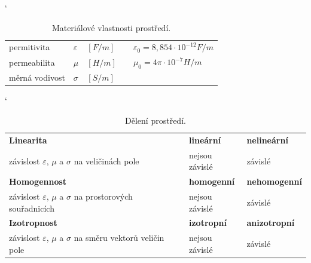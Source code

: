 \begin{table}[!h]
\catcode` 
\begin{center}
  	\caption{Materiálové vlastnosti prostředí.}
  	\label{tab:evlny_parametry_prostredi}
\begin{tabular}{|lllp{1.5cm}l|}
	\hline
	permitivita		& $\varepsilon$	& $\unit{[F/m]}$ & 	& $\varepsilon_{0} = 8,854\cdot10^{-12}\unit{F/m} $\\
	
	permeabilita	& $\mu$			& $\unit{[H/m]}$ & 	& $\mu_{0} = 4\pi\cdot10^{-7}\unit{H/m}$\\
	
	měrná vodivost	& $\sigma$		& $\unit{[S/m]}$ & 	&\\
	\hline
\end{tabular}
\end{center}
\end{table}
\begin{table}[!h]
\catcode` 
\begin{center}
  	\caption{Dělení prostředí.}
  	\label{tab:evlny_vlastnosti_prostredi}
\begin{tabular}{|lp{0.3cm}|l|l|}
	\hline
	{\bf Linearita}									& & {\bf lineární}	& {\bf nelineární}	\\
	závislost $\varepsilon$, $\mu$ a $\sigma$ na veličinách pole 		& & nejsou závislé 	& závislé		\\ 
	\hline
	{\bf Homogennost}								& & {\bf homogenní}	& {\bf nehomogenní}	\\
	závislost $\varepsilon$, $\mu$ a $\sigma$ na prostorových souřadnicích 	& & nejsou závislé 	& závislé		\\
	\hline
	{\bf Izotropnost}								& & {\bf izotropní}	& {\bf anizotropní}	\\
	závislost $\varepsilon$, $\mu$ a $\sigma$ na směru vektorů veličin pole 	& & nejsou závislé 	& závislé		\\
	\hline
\end{tabular}
\end{center}
\end{table}

